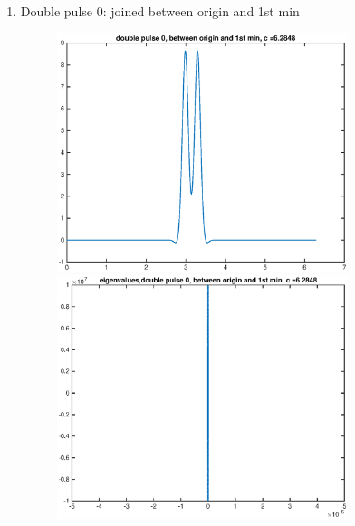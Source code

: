 \documentclass[12pt]{article}
\begin{document}
\begin{enumerate}
	\item Double pulse 0: joined between origin and 1st min
	\begin{figure}[H]
	\includegraphics[width=8.5cm]{2double0}
	\includegraphics[width=8.5cm]{2double0eig.eps}
	\end{figure}


\end{enumerate}
\end{document}
